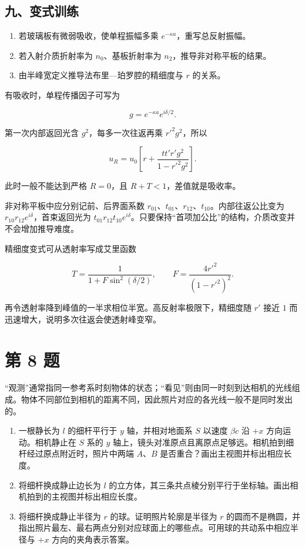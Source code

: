 \documentclass[12pt,a4paper,UTF8]{ctexart}
\newcommand{\tightlist}{\setlength{\itemsep}{0pt}\setlength{\parskip}{0pt}}
\begin{document}
\subsection{九、变式训练}\label{ux4e5dux53d8ux5f0fux8badux7ec3-6}

\begin{enumerate}
\def\labelenumi{\arabic{enumi}.}
\tightlist
\item
  若玻璃板有微弱吸收，使单程振幅多乘 \(e^{-\kappa a}\)，重写总反射振幅。
\item
  若入射介质折射率为 \(n_0\)、基板折射率为
  \(n_2\)，推导非对称平板的结果。
\item
  由半峰宽定义推导法布里---珀罗腔的精细度与 \(r\) 的关系。
\end{enumerate}

有吸收时，单程传播因子可写为

\[g=e^{-\kappa a}e^{i\delta/2}.\]

第一次内部返回光含 \(g^2\)，每多一次往返再乘 \(r'^2g^2\)，所以

\[u_R=u_0\left[r+\frac{tt'r'g^2}{1-r'^2g^2}\right].\]

此时一般不能达到严格 \(R=0\)，且 \(R+T<1\)，差值就是吸收率。

非对称平板中应分别记前、后界面系数
\(r_{01}\)、\(t_{01}\)、\(r_{12}\)、\(t_{10}\)。内部往返公比变为
\(r_{10}r_{12}e^{i\delta}\)，首束返回光为
\(t_{01}r_{12}t_{10}e^{i\delta}\)。只要保持``首项加公比''的结构，介质改变并不会增加推导难度。

精细度变式可从透射率写成艾里函数

\[T=\frac1{1+F\sin^2(\delta/2)},\qquad
F=\frac{4r'^2}{(1-r'^2)^2}.\]

再令透射率降到峰值的一半求相位半宽。高反射率极限下，精细度随 \(r'\) 接近
\(1\) 而迅速增大，说明多次往返会使透射峰变窄。

\newpage

\section{第 8 题}\label{ux7b2c-8-ux9898}

``观测''通常指同一参考系时刻物体的状态；``看见''则由同一时刻到达相机的光线组成。物体不同部位到相机的距离不同，因此照片对应的各光线一般不是同时发出的。

\begin{enumerate}
\def\labelenumi{\arabic{enumi}.}
\tightlist
\item
  一根静长为 \(l\) 的细杆平行于 \(y\) 轴，并相对地面系 \(S\) 以速度
  \(\beta c\) 沿 \(+x\) 方向运动。相机静止在 \(S\) 系的 \(y\)
  轴上，镜头对准原点且离原点足够远。相机拍到细杆经过原点附近时，照片中两端
  \(A\)、\(B\) 是否重合？画出主视图并标出相应长度。
\item
  将细杆换成静止边长为 \(l\)
  的立方体，其三条共点棱分别平行于坐标轴。画出相机拍到的主视图并标出相应长度。
\item
  将细杆换成静止半径为 \(r\) 的球。证明照片轮廓是半径为 \(r\)
  的圆而不是椭圆，并指出照片最左、最右两点分别对应球面上的哪些点。可用球的共动系中相应半径与
  \(+x\) 方向的夹角表示答案。
\end{enumerate}
\end{document}
